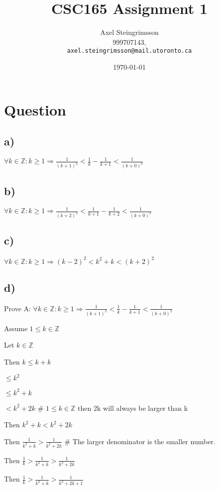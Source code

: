 \documentclass[11pt, oneside]{article}   	%
\title{CSC165 Assignment 1}
\author{Axel Steingrimsson\\
  999707143,\\
  \texttt{axel.steingrimsson@mail.utoronto.ca}}
\date{\today}						%
\begin{document}
\maketitle

\section{Question}
\subsection{a)}
$\forall k \in \mathbb{Z} : k \geq 1 \Rightarrow \frac{1}{(k+1)^2} <  \frac{1}{k} - \frac{1}{k+1} < \frac{1}{(k+0)^2}$

\subsection{b)}
$\forall k \in \mathbb{Z} : k \geq 1 \Rightarrow \frac{1}{(k+2)^2} <  \frac{1}{k+1} - \frac{1}{k+2} < \frac{1}{(k+0)^2}$

\subsection{c)}
$\forall k \in \mathbb{Z} : k \geq 1 \Rightarrow (k-2)^2 <  k^2 + k < (k+2)^2$

\subsection{d)}
Prove A: $\forall k \in \mathbb{Z} : k \geq 1 \Rightarrow \frac{1}{(k+1)^2} <  \frac{1}{k} - \frac{1}{k+1} < \frac{1}{(k+0)^2}$

Assume $ 1 \leq k \in \mathbb{Z}$ 

Let $ k \in \mathbb{Z} $

\indent \indent Then $k \leq  k + k $

\indent \indent \indent  $ \leq  k^2 $

\indent \indent \indent $\leq k^2 + k$ 

\indent \indent \indent $ < k^2 + 2k$ 
\# $1 \leq k \in \mathbb{Z}$ then 2k will always be larger than k

\indent \indent Then $ k^2 + k < k^2 + 2k$ 

\indent \indent Then $ \frac{1}{k^2 + k} > \frac{1}{k^2 + 2k}$ 
\# The larger denominator is the smaller number.

\indent \indent Then $ \frac{1}{k} > \frac{1}{k^2 + k} > \frac{1}{k^2 + 2k}$ 

\indent \indent Then $ \frac{1}{k} > \frac{1}{k^2 + k} > \frac{1}{k^2 + 2k + 1}$ 
\end{document}
